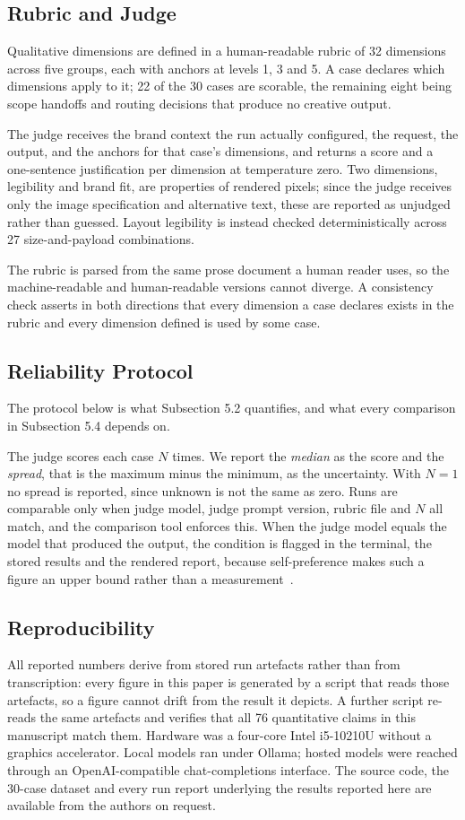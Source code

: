 \documentclass[9pt,twocolumn]{extarticle}
\begin{document}
\subsection{Rubric and Judge}
Qualitative dimensions are defined in a human-readable rubric of 32 dimensions
across five groups, each with anchors at levels 1, 3 and 5. A case declares
which dimensions apply to it; 22 of the 30 cases are scorable, the remaining
eight being scope handoffs and routing decisions that produce no creative
output.

The judge receives the brand context the run actually configured, the request,
the output, and the anchors for that case's dimensions, and returns a score and
a one-sentence justification per dimension at temperature zero. Two dimensions,
legibility and brand fit, are properties of rendered pixels; since the judge
receives only the image specification and alternative text, these are reported
as unjudged rather than guessed. Layout legibility is instead checked
deterministically across 27 size-and-payload combinations.

The rubric is parsed from the same prose document a human reader uses, so the
machine-readable and human-readable versions cannot diverge. A consistency
check asserts in both directions that every dimension a case declares exists in
the rubric and every dimension defined is used by some case.

\subsection{Reliability Protocol}
\label{sec:protocol}
The protocol below is what Subsection 5.2 quantifies, and what every comparison
in Subsection 5.4 depends on.

The judge scores each case $N$ times. We report the \textit{median} as the
score and the \textit{spread}, that is the maximum minus the minimum, as the
uncertainty. With $N=1$ no spread is reported, since unknown is not the same as
zero. Runs are comparable only when judge model, judge prompt version, rubric
file and $N$ all match, and the comparison tool enforces this. When the judge
model equals the model that produced the output, the condition is flagged in
the terminal, the stored results and the rendered report, because
self-preference makes such a figure an upper bound rather than a
measurement~\cite{panickssery2024selfpref}.

\subsection{Reproducibility}
All reported numbers derive from stored run artefacts rather than from
transcription: every figure in this paper is generated by a script that reads
those artefacts, so a figure cannot drift from the result it depicts. A further
script re-reads the same artefacts and verifies that all 76 quantitative claims
in this manuscript match them. Hardware was a four-core Intel i5-10210U without
a graphics accelerator. Local models ran under Ollama; hosted models were
reached through an OpenAI-compatible chat-completions interface. The source
code, the 30-case dataset and every run report underlying the results reported
here are available from the authors on request.
\end{document}

